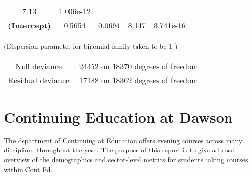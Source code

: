 \documentclass[]{book}
\theoremstyle{definition}
\theoremstyle{definition}
\theoremstyle{remark}
\begin{document}
\begin{longtable}[]{@{}ccccc@{}}
\begin{minipage}[t]{0.12\columnwidth}
7.13\strut
\end{minipage} & \begin{minipage}[t]{0.12\columnwidth}\centering\strut
1.006e-12\strut
\end{minipage}\tabularnewline
\begin{minipage}[t]{0.30\columnwidth}\centering\strut
\textbf{(Intercept)}\strut
\end{minipage} & \begin{minipage}[t]{0.13\columnwidth}\centering\strut
0.5654\strut
\end{minipage} & \begin{minipage}[t]{0.16\columnwidth}\centering\strut
0.0694\strut
\end{minipage} & \begin{minipage}[t]{0.12\columnwidth}\centering\strut
8.147\strut
\end{minipage} & \begin{minipage}[t]{0.12\columnwidth}\centering\strut
3.741e-16\strut
\end{minipage}\tabularnewline
\bottomrule
\end{longtable}

(Dispersion parameter for binomial family taken to be 1 )

\begin{longtable}[]{@{}cl@{}}
\toprule
\begin{minipage}[t]{0.25\columnwidth}\centering\strut
Null deviance:\strut
\end{minipage} & \begin{minipage}[t]{0.35\columnwidth}\raggedright\strut
24452 on 18370 degrees of freedom\strut
\end{minipage}\tabularnewline
\begin{minipage}[t]{0.25\columnwidth}\centering\strut
Residual deviance:\strut
\end{minipage} & \begin{minipage}[t]{0.35\columnwidth}\raggedright\strut
17188 on 18362 degrees of freedom\strut
\end{minipage}\tabularnewline
\bottomrule
\end{longtable}

\chapter{Continuing Education at
Dawson}\label{continuing-education-at-dawson}

The department of Continuing at Education offers evening courses across
many disciplines throughout the year. The purpose of this report is to
give a broad overview of the demographics and sector-level metrics for
students taking courses within Cont Ed.
\end{document}
